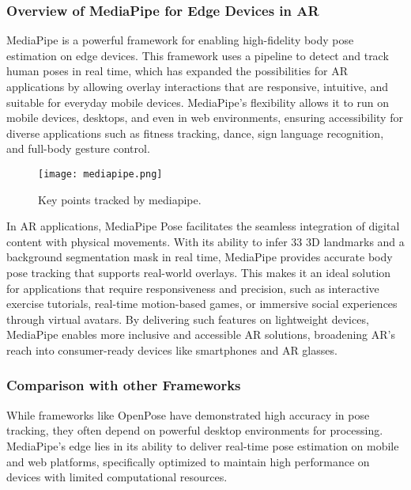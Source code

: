 \subsubsection{Overview of MediaPipe for Edge Devices in AR}

MediaPipe\cite{lugaresi2019mediapipe} is a powerful framework for enabling high-fidelity body pose estimation on edge devices.
This framework uses a pipeline to detect and track human poses in real time, which has expanded the possibilities for AR applications by allowing overlay interactions that are responsive, intuitive, and suitable for everyday mobile devices.
MediaPipe's flexibility allows it to run on mobile devices, desktops, and even in web environments, ensuring accessibility for diverse applications such as fitness tracking, dance, sign language recognition, and full-body gesture control.

\begin{figure}[!h]
    \centering
    \texttt{[image: mediapipe.png]}
    \caption{Key points tracked by mediapipe.}
    \vspace{0.1cm}
    \label{fig:mediapipe}
\end{figure}

In AR applications, MediaPipe Pose facilitates the seamless integration of digital content with physical movements.
With its ability to infer 33 3D landmarks and a background segmentation mask in real time, MediaPipe provides accurate body pose tracking that supports real-world overlays.
This makes it an ideal solution for applications that require responsiveness and precision, such as interactive exercise tutorials, real-time motion-based games, or immersive social experiences through virtual avatars.
By delivering such features on lightweight devices, MediaPipe enables more inclusive and accessible AR solutions, broadening AR’s reach into consumer-ready devices like smartphones and AR glasses.

\subsubsection{Comparison with other Frameworks}

While frameworks like OpenPose\cite{cao2017realtime} have demonstrated high accuracy in pose tracking, they often depend on powerful desktop environments for processing.
MediaPipe’s edge lies in its ability to deliver real-time pose estimation on mobile and web platforms, specifically optimized to maintain high performance on devices with limited computational resources.

